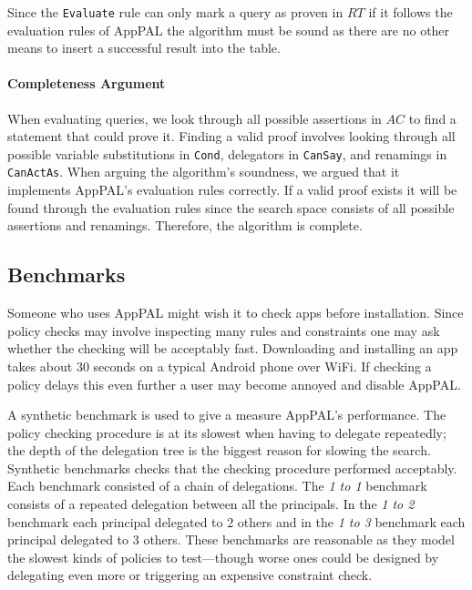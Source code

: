 \documentclass[thesis.tex]{subfiles}
\begin{document}
Since the \texttt{Evaluate} rule can only mark a query as proven in $RT$ if it
follows the evaluation rules of AppPAL the algorithm must be sound as there are
no other means to insert a successful result into the table.

\paragraph*{Completeness Argument}

When evaluating queries, we look through all possible assertions in $AC$ to find
a statement that could prove it. Finding a valid proof involves looking through
all possible variable substitutions in \texttt{Cond}, delegators in
\texttt{CanSay}, and renamings in \texttt{CanActAs}. When arguing the
algorithm's soundness, we argued that it implements AppPAL's evaluation rules
correctly. If a valid proof exists it will be found through the evaluation rules
since the search space consists of all possible assertions and renamings.
Therefore, the algorithm is complete.

\subsection{Benchmarks}
\label{ssec:benchmarks}

Someone who uses AppPAL might wish it to check apps before installation. Since
policy checks may involve inspecting many rules and constraints one may ask
whether the checking will be acceptably fast. Downloading and installing an app
takes about 30 seconds on a typical Android phone over WiFi. If checking a
policy delays this even further a user may become annoyed and disable AppPAL.

A synthetic benchmark is used to give a measure AppPAL's performance. The policy
checking procedure is at its slowest when having to delegate repeatedly; the
depth of the delegation tree is the biggest reason for slowing the search.
Synthetic benchmarks checks that the checking procedure performed acceptably.
Each benchmark consisted of a chain of delegations. The \emph{1 to 1} benchmark
consists of a repeated delegation between all the principals. In the \emph{1 to
2} benchmark each principal delegated to 2 others and in the \emph{1 to 3}
benchmark each principal delegated to 3 others. These benchmarks are reasonable
as they model the slowest kinds of policies to test---though worse ones could be
designed by delegating even more or triggering an expensive constraint check.
\end{document}
